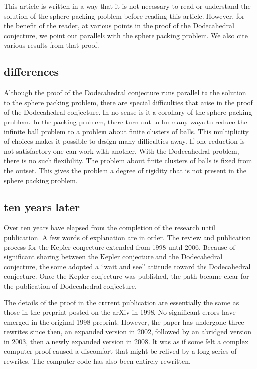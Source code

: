 This article is written in a way that it is not necessary to
read or understand the solution of the sphere packing problem before
reading this article.  However, for the benefit of the reader,
at various points in the proof
of the Dodecahedral conjecture, we point out 
parallels with the sphere packing problem.  We also cite various results
from that proof.



\subsection{differences}

Although the proof of the Dodecahedral conjecture runs parallel
to the solution to the sphere packing problem, there are special
difficulties that arise in the proof of the Dodecahedral conjecture.
In no sense is it a corollary of the sphere packing problem.
In the packing problem, there turn out to be many ways to
reduce the infinite ball problem to a problem about finite clusters
of balls.  This multiplicity of choices makes it
possible to design many difficulties away.  If one reduction is
not satisfactory one can work with
another.
With the Dodecahedral problem, there is no such flexibility.
The problem about finite clusters of balls is fixed from the outset.
This gives the problem a degree of rigidity that is not present
in the sphere packing problem.


\subsection{ten years later}

Over ten years have elapsed from the completion of the research until 
publication.  A few words of explanation are in order.
The review and 
publication process for the Kepler conjecture extended from 1998
until 2006.  Because of significant sharing between the Kepler conjecture
and the Dodecahedral conjecture, the some adopted a ``wait and see''
attitude toward the Dodecahedral conjecture.  Once the Kepler conjecture
was published, the path became clear for the publication of Dodecahedral
conjecture.  

The details of the proof in the current publication are essentially the
same as those in the preprint posted on the arXiv in 1998.  No
significant errors have emerged in the original 1998 preprint.   However,
the paper has undergone three rewrites since then, an expanded version in 2002, followed by an abridged version in 2003, then a newly expanded version in 2008.  It was as if some felt a complex computer proof caused a discomfort that might be relived by a long series of
rewrites. The computer code has
also been entirely rewritten.

